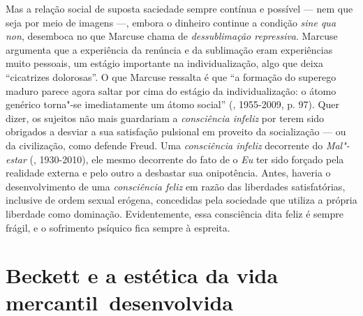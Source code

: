 Mas a relação social de suposta saciedade sempre contínua e possível ---
nem que seja por meio de imagens \mbox{---,} embora o dinheiro continue a
condição \emph{sine qua non}, desemboca no que Marcuse chama de
\emph{dessublimação repressiva}. Marcuse argumenta que a experiência da
renúncia e da sublimação eram experiências muito pessoais, um estágio
importante na individualização, algo que deixa ``cicatrizes dolorosas''.
O que Marcuse ressalta é que ``a formação do superego maduro parece
agora saltar por cima do estágio da individualização: o átomo genérico
torna"-se imediatamente um átomo social'' (, 1955-2009, p. 97).
Quer dizer, os sujeitos não mais guardariam a \emph{consciência infeliz}
por terem sido obrigados a desviar a sua satisfação pulsional em
proveito da socialização --- ou da civilização, como defende Freud. Uma
\emph{consciência infeliz} decorrente do \emph{Mal"-estar} (,
1930-2010), ele mesmo decorrente do fato de o \emph{Eu} ter sido forçado
pela realidade externa e pelo outro a desbastar sua onipotência. Antes,
haveria o desenvolvimento de uma \emph{consciência feliz} em razão das
liberdades satisfatórias, inclusive de ordem sexual erógena, concedidas
pela sociedade que utiliza a própria liberdade como dominação. Evidentemente, essa consciência dita feliz é sempre frágil, e o sofrimento psíquico fica sempre à espreita.

\section{Beckett e a estética da vida mercantil~desenvolvida}


